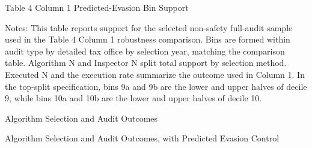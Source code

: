 \documentclass{article}
\newcommand{\OutPath}{Output/}%
\newcommand{\OutPath}{../Output/}%
\begin{document}
\begin{landscape}
\begin{table}[H]
\begin{adjustbox}{max width=1.4\textwidth}
\begin{threeparttable}
\begin{tablenotes}[flushleft]
\end{tablenotes}
\end{threeparttable}
\end{adjustbox}
\end{table}

\begin{table}[H]\centering
\begin{adjustbox}{max width=1.05\textwidth}
\begin{threeparttable}
\caption{Table 4 Column 1 Predicted-Evasion Bin Support}
\label{tab:table4_col1_predicted_evasion_bin_support}

\footnotesize


\begin{tablenotes}[flushleft]
\footnotesize
\item Notes: This table reports support for the selected non-safety full-audit sample used in the Table 4 Column 1 robustness comparison. Bins are formed within audit type by detailed tax office by selection year, matching the comparison table. Algorithm N and Inspector N split total support by selection method. Executed N and the execution rate summarize the outcome used in Column 1. In the top-split specification, bins 9a and 9b are the lower and upper halves of decile 9, while bins 10a and 10b are the lower and upper halves of decile 10.
\end{tablenotes}
\end{threeparttable}
\end{adjustbox}
\end{table}

\begin{table}[H]\centering
\begin{adjustbox}{max width=1.4\textwidth}
\begin{threeparttable}
\caption{Algorithm Selection and Audit Outcomes}
\label{tab:table4_main_outcomes_replicated}

\footnotesize


\begin{tablenotes}[flushleft]
\end{tablenotes}
\end{threeparttable}
\end{adjustbox}
\end{table}

\begin{table}[H]\centering
\begin{adjustbox}{max width=1.4\textwidth}
\begin{threeparttable}
\caption{Algorithm Selection and Audit Outcomes, with Predicted Evasion Control}
\label{tab:table4_main_outcomes_yhatrf_control}


\end{threeparttable}
\end{adjustbox}
\end{table}
\end{landscape}
\end{document}
